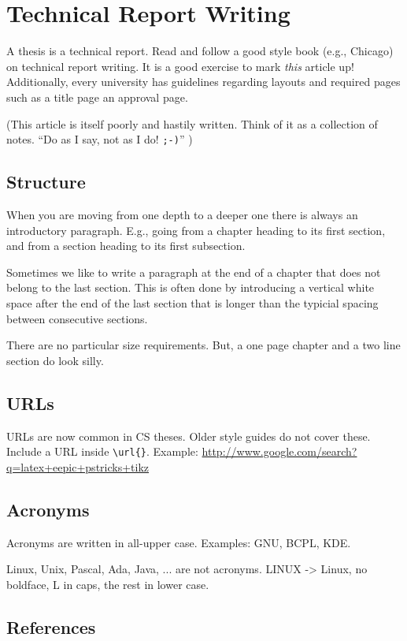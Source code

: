 \chapter{Technical Report Writing}

A thesis is a technical report.  Read and follow a good style book
(e.g., Chicago) on technical report writing.  It is a good exercise to
mark {\em this} article up!  Additionally, every university has
guidelines regarding layouts and required pages such as a title page
an approval page.

(This article is itself poorly and hastily written.  Think of it as a
collection of notes.  ``Do as I say, not as I do! {\tt ;-)}'' )


\section{Structure}

When you are moving from one depth to a deeper one there is always an
introductory paragraph.  E.g., going from a chapter heading to its
first section, and from a section heading to its first subsection.

Sometimes we like to write a paragraph at the end of a
chapter that does not belong to the last section.  This is often done
by introducing a vertical white space after the end of the last
section that is longer than the typicial spacing between consecutive
sections.

There are no particular size requirements.  But, a one page chapter
and a two line section do look silly.

\section{URLs}

URLs are now common in CS theses.  Older style guides do not cover these.
Include a URL inside \verb|\url{}|. Example:
\url{http://www.google.com/search?q=latex+eepic+pstricks+tikz}
\section{Acronyms}

Acronyms are written in all-upper case.  Examples: GNU, BCPL, KDE.

Linux, Unix, Pascal, Ada, Java, ... are not acronyms.  LINUX -> Linux,
no boldface, L in caps, the rest in lower case.

\section{References}



